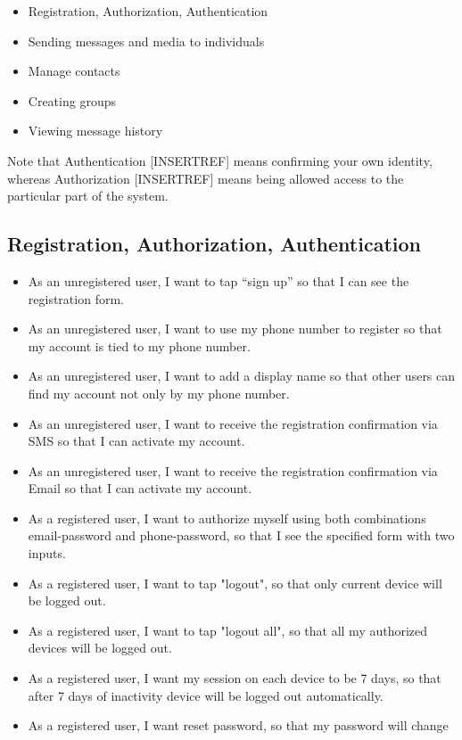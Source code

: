 \begin{itemize}
    \item Registration, Authorization, Authentication
    \item Sending messages and media to individuals
    \item Manage contacts
    \item Creating groups
    \item Viewing message history
\end{itemize}
Note that Authentication [INSERTREF] means confirming your own identity, whereas Authorization [INSERTREF] means being allowed access to the
particular part of the system.

\subsection{Registration, Authorization, Authentication}\label{subsec:registration-authorization-authentication}
\begin{itemize}
    \item As an unregistered user, I want to tap “sign up” so that I can see the registration form.
    \item As an unregistered user, I want to use my phone number to register so that my account is tied to my phone number.
    \item As an unregistered user, I want to add a display name so that other users can find my account not only by my phone number.
    \item As an unregistered user, I want to receive the registration confirmation via SMS so that I can activate my account.
    \item As an unregistered user, I want to receive the registration confirmation via Email so that I can activate my account.
    \item As a registered user, I want to authorize myself using both combinations email-password and phone-password, so that I see the specified form with two inputs.
    \item As a registered user, I want to tap "logout", so that only current device will be logged out.
    \item As a registered user, I want to tap "logout all", so that all my authorized devices will be logged out.
    \item As a registered user, I want my session on each device to be 7 days, so that after 7 days of inactivity device will be logged out automatically.
    \item As a registered user, I want reset password, so that my password will change
\end{itemize}

